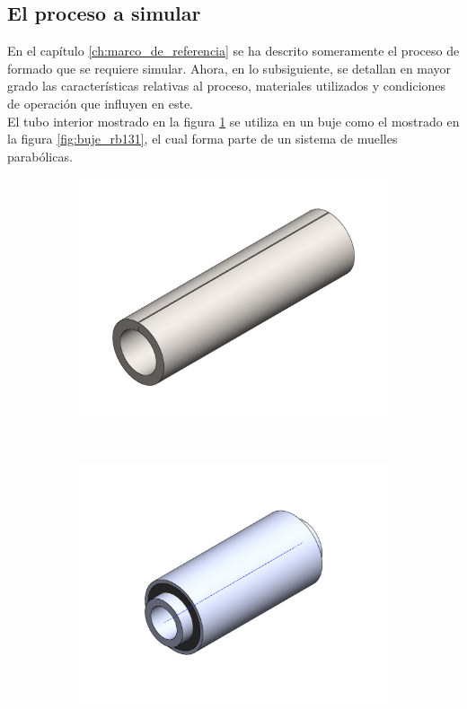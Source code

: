 \subsection{El proceso a simular}

En el capítulo \ref{ch:marco_de_referencia} se ha descrito someramente el proceso de formado que se requiere 
simular. Ahora, en lo subsiguiente, se detallan en mayor grado las características 
relativas al proceso, materiales utilizados y condiciones de operación que influyen en este. \\

El tubo interior mostrado en la figura \ref{fig:ti_rb131} se utiliza en un buje como 
el mostrado en la figura \ref{fig:buje_rb131}, el cual forma parte de un sistema de muelles 
parabólicas.

\begin{figure}[H]
\centering
\begin{subfigure}[t]{0.35\textwidth}
\centering
\includegraphics[width=\textwidth]{src/ch3/ti_rb131.pdf}
\caption{}
\label{fig:ti_rb131}
\end{subfigure}
~  
\begin{subfigure}[t]{0.35\textwidth}
\centering
\includegraphics[width=\textwidth]{src/ch3/buje_rb131.pdf}

\end{subfigure}
\end{figure}
